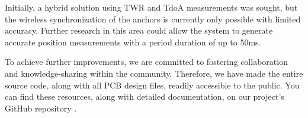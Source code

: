 \documentclass[10pt,a4paper,twocolumn]{article}
\begin{document}
Initially, a hybrid solution using \ac{TWR} and \ac{TdoA} measurements was sought,
but the wireless synchronization of the anchors is currently only possible with limited accuracy.
Further research in this area could allow the system to generate accurate position measurements with a period duration of up to 50ms.

To achieve further improvements, we are committed to fostering collaboration and knowledge-sharing
within the community.
Therefore, we have made the entire source code, along with all PCB design files,
readily accessible to the public.
You can find these resources, along with detailed documentation,
on our project's GitHub repository \cite{uwb-tracking}.




\end{document}
